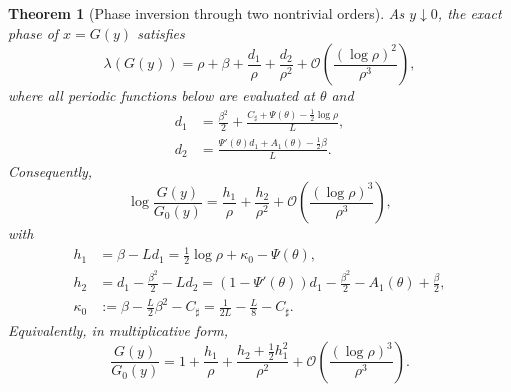 \documentclass[11pt,oneside]{article}
\numberwithin{equation}{section}
\newtheorem{theorem}{Theorem}[section]
\theoremstyle{definition}
\theoremstyle{remark}
\newcommand{\bigO}{\mathcal O}
\begin{document}
\begin{theorem}[Phase inversion through two nontrivial orders]
\label{p1:thm:phase-two-orders}
As $y\downarrow0$, the exact phase of $x=G(y)$ satisfies
\begin{equation}
 \boxed{
 \lambda(G(y))=
 \rho+\beta+\frac{d_1}{\rho}+\frac{d_2}{\rho^2}
 +\bigO\!\left(\frac{(\log\rho)^2}{\rho^3}\right),}
 \label{p1:eq:lambda-inverse-two-orders}
\end{equation}
where all periodic functions below are evaluated at $\theta$ and
\begin{align}
 d_1&=\frac{\beta^2}{2}
 +\frac{C_{\sharp}+\Psi(\theta)-\tfrac12\log\rho}{L},
 \label{p1:eq:d1-endpoint}\\
 d_2&=\frac{\Psi'(\theta)d_1+A_1(\theta)-\tfrac12\beta}{L}.
 \label{p1:eq:d2-endpoint}
\end{align}
Consequently,
\begin{equation}
 \boxed{
 \log\frac{G(y)}{G_0(y)}
 =\frac{h_1}{\rho}+\frac{h_2}{\rho^2}
 +\bigO\!\left(\frac{(\log\rho)^3}{\rho^3}\right),}
 \label{p1:eq:log-inverse-two-orders}
\end{equation}
with
\begin{align}
 h_1&=\beta-Ld_1
 =\frac12\log\rho+\kappa_0-\Psi(\theta),
 \label{p1:eq:h1}\\
 h_2&=d_1-\frac{\beta^2}{2}-Ld_2
 =(1-\Psi'(\theta))d_1-\frac{\beta^2}{2}
   -A_1(\theta)+\frac\beta2,
 \label{p1:eq:h2}\\
 \kappa_0&:=\beta-\frac L2\beta^2-C_{\sharp}
 =\frac1{2L}-\frac L8-C_{\sharp}.
 \label{p1:eq:kappa0}
\end{align}
Equivalently, in multiplicative form,
\begin{equation}
 \boxed{
 \frac{G(y)}{G_0(y)}
 =1+\frac{h_1}{\rho}
 +\frac{h_2+\tfrac12h_1^2}{\rho^2}
 +\bigO\!\left(\frac{(\log\rho)^3}{\rho^3}\right).}
 \label{p1:eq:inverse-multiplicative-two-orders}
\end{equation}
\end{theorem}
\end{document}
